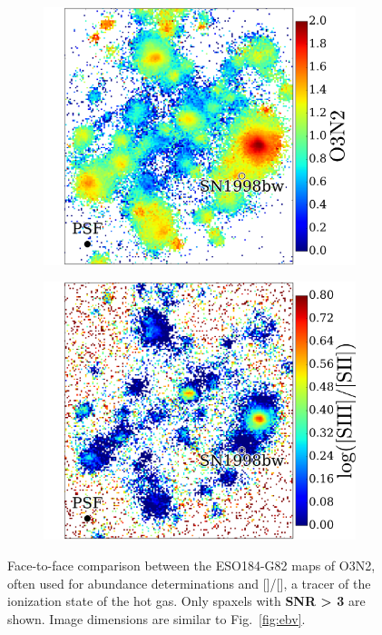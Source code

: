 \documentclass[traditabstract, referee]{aa}
\newcommand{\sii}{[\ion{S}{ii}]}
\newcommand{\siii}{[\ion{S}{iii}]}
\begin{document}
\begin{figure}
\centering
\begin{subfigure}{.4\textwidth}
  \includegraphics[width=0.999\linewidth]{Figs/MUSE_SN1998bw_O3N2.pdf}
\end{subfigure}
\begin{subfigure}{.417\textwidth}
  \includegraphics[width=0.999\linewidth]{Figs/MUSE_SN1998bw_S3S2.pdf}
\end{subfigure}
\caption{Face-to-face comparison between the ESO184-G82 maps of O3N2, often used for abundance determinations and \siii/\sii, a tracer of the ionization state of the hot gas. Only spaxels with \textbf{SNR > 3} are shown. Image dimensions are similar to Fig.~\ref{fig:ebv}.}
\label{fig:s3s2}
\end{figure}
\end{document}
